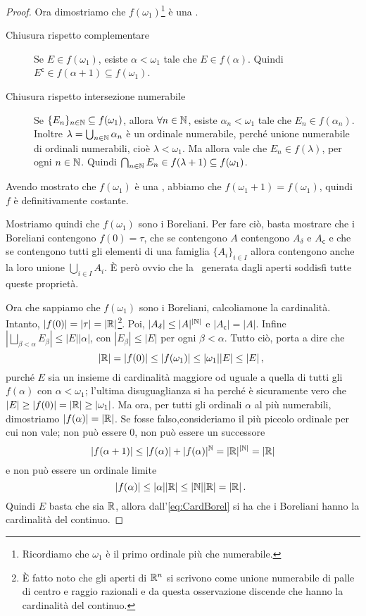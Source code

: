 \begin{proof}
	Ora dimostriamo che $f(\omega_1)$\footnote{Ricordiamo che $\omega_1$ è il primo ordinale più che numerabile.} è una \sigalg.
	\begin{description}
	 \item[Chiusura rispetto complementare] Se $E\in f(\omega_1)$, esiste $\alpha<\omega_1$ tale che $E\in f(\alpha)$.
		Quindi $E^\mathsf{c}\in f(\alpha+1) \subseteq f(\omega_1)$.
	 \item[Chiusura rispetto intersezione numerabile] Se $\{E_n\}_{n\in\mathbb N}\subseteq f(\omega_1)$, allora $\forall n\in\mathbb N$, esiste $\alpha_n<\omega_1$
		tale che $E_n\in f(\alpha_n)$. Inoltre $\lambda=\bigcup_{n\in\mathbb N}\alpha_n$ è un ordinale numerabile, perché unione numerabile di ordinali
		numerabili, cioè $\lambda<\omega_1$. Ma allora vale che $E_n\in f(\lambda)$, per ogni $n\in\mathbb N$.
		Quindi $\bigcap_{n\in\mathbb N}E_n\in f(\lambda+1)\subseteq f(\omega_1)$.
	\end{description}
	
	Avendo mostrato che $f(\omega_1)$ è una \sigalg, abbiamo che $f(\omega_1+1)=f(\omega_1)$, quindi $f$ è definitivamente costante.
	
	Mostriamo quindi che $f(\omega_1)$ sono i Boreliani.
	Per fare ciò, basta mostrare che i Boreliani contengono $f(0)=\tau$, che se contengono $A$ contengono $A_{\delta}$ e $A_{\mathsf{c}}$ e che
	se contengono tutti gli elementi di una famiglia $\{A_i\}_{i\in I}$ allora contengono anche la loro unione $\bigcup_{i\in I}A_i$.
	È però ovvio che la \sigalg \ generata dagli aperti soddisfi tutte queste proprietà.
	
	Ora che sappiamo che $f(\omega_1)$ sono i Boreliani, calcoliamone la cardinalità.
	Intanto, $|f(0)|=|\tau|=|\mathbb R|$\footnote{È fatto noto che gli aperti di $\mathbb R^n$ si scrivono come unione numerabile di palle di centro e raggio razionali e da questa osservazione discende che hanno la cardinalità del continuo.}. Poi, $|A_{\delta}|\leq |A|^{|\mathbb N|}$ e $|A_{\mathsf{c}}|=|A|$.
	Infine $|\bigsqcup_{\beta<\alpha}E_{\beta}| \leq |E||\alpha|$, con $|E_{\beta}|\leq |E|$ per ogni $\beta < \alpha$. Tutto ciò, porta a dire che
	\begin{equation}\label{eq:CardBorel}
		|\mathbb R|=|f(0)|\leq |f(\omega_1)| \leq |\omega_1||E| \leq |E| \, \text{, }
	\end{equation}
	purché $E$ sia un insieme di cardinalità maggiore od uguale a quella di tutti gli $f(\alpha)$ con $\alpha<\omega_1$;
	l'ultima disuguaglianza si ha perché è sicuramente vero che $|E|\geq |f(0)| = |\mathbb R| \geq |\omega_1|$.
	Ma ora, per tutti gli ordinali $\alpha$ al più numerabili, dimostriamo $|f(\alpha)|=|\mathbb R|$. 
	Se fosse falso,consideriamo il più piccolo ordinale per cui non vale;
	non può essere $0$, non può essere un successore
	\[
		|f(\alpha+1)|\leq |f(\alpha)|+|f(\alpha)|^{\mathbb N} = |\mathbb R|^{|\mathbb N|} = |\mathbb R|
	\]
	e non può essere un ordinale limite
	\[
		|f(\alpha)|\leq |\alpha| |\mathbb R| \leq |\mathbb N||\mathbb R| = |\mathbb R| \, \text{. }
	\]
	Quindi $E$ basta che sia $\mathbb R$, allora dall'\cref{eq:CardBorel} si ha che i Boreliani hanno la cardinalità del continuo.
\end{proof}
